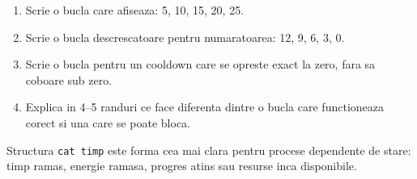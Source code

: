 
\begin{solobox}
\begin{enumerate}
\item Scrie o bucla care afiseaza: 5, 10, 15, 20, 25.
\item Scrie o bucla descrescatoare pentru numaratoarea: 12, 9, 6, 3, 0.
\item Scrie o bucla pentru un cooldown care se opreste exact la zero, fara sa coboare sub zero.
\item Explica in 4--5 randuri ce face diferenta dintre o bucla care functioneaza corect si una care se poate bloca.
\end{enumerate}
\end{solobox}

\begin{checkpointbox}
Structura \texttt{cat timp} este forma cea mai clara pentru procese dependente de stare: timp ramas, energie ramasa, progres atins sau resurse inca disponibile.
\end{checkpointbox}

\clearpage
